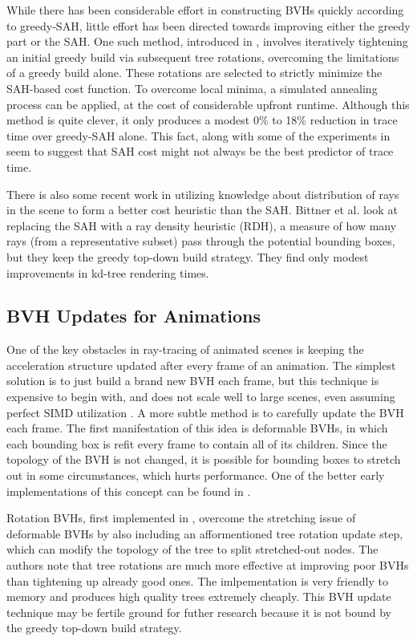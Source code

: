 \documentclass[twocolumn]{article}
\begin{document}
While there has been considerable effort in constructing BVHs quickly according to greedy-SAH, little effort has been directed towards improving either the greedy part or the SAH.  One such method, introduced in \cite{Kensler08}, involves iteratively tightening an initial greedy build via subsequent tree rotations, overcoming the limitations of a greedy build alone.  These rotations are selected to strictly minimize the SAH-based cost function.  To overcome local minima, a simulated annealing process can be applied, at the cost of considerable upfront runtime.  Although this method is quite clever, it only produces a modest 0\% to 18\% reduction in trace time over greedy-SAH alone.  This fact, along with some of the experiments in \cite{Kensler08} seem to suggest that SAH cost might not always be the best predictor of trace time.

There is also some recent work in utilizing knowledge about distribution of rays in the scene to form a better cost heuristic than the SAH.  Bittner et al. \cite{Bittner09} look at replacing the SAH with a ray density heuristic (RDH), a measure of how many rays (from a representative subset) pass through the potential bounding boxes, but they keep the greedy top-down build strategy.  They find only modest improvements in kd-tree rendering times.  

\subsection{BVH Updates for Animations}

One of the key obstacles in ray-tracing of animated scenes is keeping the acceleration structure updated after every frame of an animation.  The simplest solution is to just build a brand new BVH each frame, but this technique is expensive to begin with, and does not scale well to large scenes, even assuming perfect SIMD utilization \cite{Kopta11}.  A more subtle method is to carefully update the BVH each frame.  The first manifestation of this idea is deformable BVHs, in which each bounding box is refit every frame to contain all of its children.  Since the topology of the BVH is not changed, it is possible for bounding boxes to stretch out in some circumstances, which hurts performance.  One of the better early implementations of this concept can be found in \cite{Wald07}.  

Rotation BVHs, first implemented in \cite{Kopta11}, overcome the stretching issue of deformable BVHs by also including an afformentioned tree rotation update step, which can modify the topology of the tree to split stretched-out nodes.  The authors note that tree rotations are much more effective at improving poor BVHs than tightening up already good ones.  The imlpementation is very friendly to memory and produces high quality trees extremely cheaply.  This BVH update technique may be fertile ground for futher research because it is not bound by the greedy top-down build strategy.    



\end{document}
